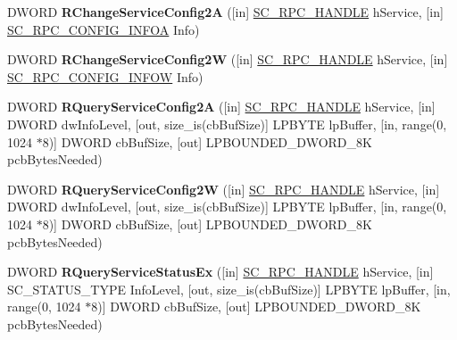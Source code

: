 \begin{DoxyCompactItemize}
\item 
\mbox{\label{interfacesvcctl_ad6f19ec984a5c34d43fec95447439ee2}} 
D\+W\+O\+RD {\bfseries R\+Change\+Service\+Config2A} (\mbox{[}in\mbox{]} \hyperlink{interfacevoid}{S\+C\+\_\+\+R\+P\+C\+\_\+\+H\+A\+N\+D\+LE} h\+Service, \mbox{[}in\mbox{]} \hyperlink{struct___s_c___r_p_c___c_o_n_f_i_g___i_n_f_o_a}{S\+C\+\_\+\+R\+P\+C\+\_\+\+C\+O\+N\+F\+I\+G\+\_\+\+I\+N\+F\+OA} Info)
\item 
\mbox{\label{interfacesvcctl_adcc83975443a3800569fe1f98563e8af}} 
D\+W\+O\+RD {\bfseries R\+Change\+Service\+Config2W} (\mbox{[}in\mbox{]} \hyperlink{interfacevoid}{S\+C\+\_\+\+R\+P\+C\+\_\+\+H\+A\+N\+D\+LE} h\+Service, \mbox{[}in\mbox{]} \hyperlink{struct___s_c___r_p_c___c_o_n_f_i_g___i_n_f_o_w}{S\+C\+\_\+\+R\+P\+C\+\_\+\+C\+O\+N\+F\+I\+G\+\_\+\+I\+N\+F\+OW} Info)
\item 
\mbox{\label{interfacesvcctl_a5c08b32e6242a27c2e714ea1696b4a04}} 
D\+W\+O\+RD {\bfseries R\+Query\+Service\+Config2A} (\mbox{[}in\mbox{]} \hyperlink{interfacevoid}{S\+C\+\_\+\+R\+P\+C\+\_\+\+H\+A\+N\+D\+LE} h\+Service, \mbox{[}in\mbox{]} D\+W\+O\+RD dw\+Info\+Level, \mbox{[}out, size\+\_\+is(cb\+Buf\+Size)\mbox{]} L\+P\+B\+Y\+TE lp\+Buffer, \mbox{[}in, range(0, 1024 $\ast$8)\mbox{]} D\+W\+O\+RD cb\+Buf\+Size, \mbox{[}out\mbox{]} L\+P\+B\+O\+U\+N\+D\+E\+D\+\_\+\+D\+W\+O\+R\+D\+\_\+8K pcb\+Bytes\+Needed)
\item 
\mbox{\label{interfacesvcctl_a6b1bf62d227a9a5d5c588715c63a6a0e}} 
D\+W\+O\+RD {\bfseries R\+Query\+Service\+Config2W} (\mbox{[}in\mbox{]} \hyperlink{interfacevoid}{S\+C\+\_\+\+R\+P\+C\+\_\+\+H\+A\+N\+D\+LE} h\+Service, \mbox{[}in\mbox{]} D\+W\+O\+RD dw\+Info\+Level, \mbox{[}out, size\+\_\+is(cb\+Buf\+Size)\mbox{]} L\+P\+B\+Y\+TE lp\+Buffer, \mbox{[}in, range(0, 1024 $\ast$8)\mbox{]} D\+W\+O\+RD cb\+Buf\+Size, \mbox{[}out\mbox{]} L\+P\+B\+O\+U\+N\+D\+E\+D\+\_\+\+D\+W\+O\+R\+D\+\_\+8K pcb\+Bytes\+Needed)
\item 
\mbox{\label{interfacesvcctl_aa85d0069282ce7a8607dbe3ac8f4162f}} 
D\+W\+O\+RD {\bfseries R\+Query\+Service\+Status\+Ex} (\mbox{[}in\mbox{]} \hyperlink{interfacevoid}{S\+C\+\_\+\+R\+P\+C\+\_\+\+H\+A\+N\+D\+LE} h\+Service, \mbox{[}in\mbox{]} S\+C\+\_\+\+S\+T\+A\+T\+U\+S\+\_\+\+T\+Y\+PE Info\+Level, \mbox{[}out, size\+\_\+is(cb\+Buf\+Size)\mbox{]} L\+P\+B\+Y\+TE lp\+Buffer, \mbox{[}in, range(0, 1024 $\ast$8)\mbox{]} D\+W\+O\+RD cb\+Buf\+Size, \mbox{[}out\mbox{]} L\+P\+B\+O\+U\+N\+D\+E\+D\+\_\+\+D\+W\+O\+R\+D\+\_\+8K pcb\+Bytes\+Needed)

\end{DoxyCompactItemize}
